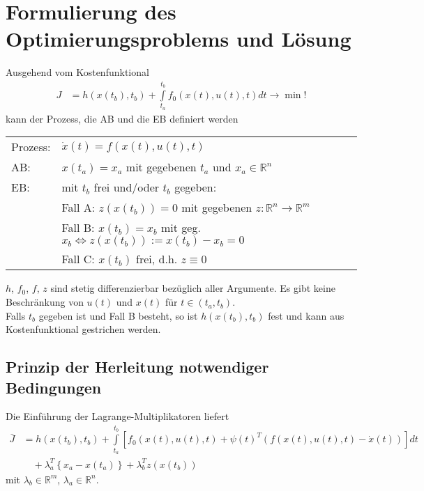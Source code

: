 \section{Formulierung des Optimierungsproblems und Lösung}
Ausgehend vom Kostenfunktional
\begin{align*}
	J & = h\left(x(t_b),t_b \right) + \int\limits_{t_a}^{t_b}f_0\left(x(t),u(t),t \right)dt\rightarrow \min!
\end{align*}
kann der Prozess, die \ac{AB} und die \ac{EB} definiert werden\\
\begin{tabular}{ll}
Prozess: & $\dot{x}(t)=f\left(x(t),u(t),t \right)$\\
\ac{AB}: & $x(t_a)=x_a$ mit gegebenen $t_a$ und $x_a\in\mathbb{R}^n$\\
\ac{EB}: & mit $t_b$ frei und/oder $t_b$ gegeben:\\
		 & Fall A: $z\left(x(t_b) \right)=0$ mit gegebenen $z:\mathbb{R}^n\rightarrow\mathbb{R}^m$\\
		 & Fall B: $x(t_b)=x_b$ mit geg. $x_b\Leftrightarrow z(x(t_b)):=x(t_b)-x_b=0$\\
		 & Fall C: $x(t_b)$ frei, d.h. $z\equiv 0$ 
\end{tabular}
$h$, $f_0$, $f$, $z$ sind stetig differenzierbar bezüglich aller Argumente. Es gibt keine Beschränkung von $u(t)$ und $x(t)$ für $t\in\left(t_a, t_b
\right)$.\\
Falls $t_b$ gegeben ist und Fall B besteht, so ist $h(x(t_b),t_b)$ fest und kann aus Kostenfunktional gestrichen werden.

\subsection{Prinzip der Herleitung notwendiger Bedingungen}
\label{sec:kap_2_pr_herl_not_bed}
Die Einführung der Lagrange-Multiplikatoren liefert
\begin{align*}
	\bar{J} & = h\left(x(t_b),t_b \right)+\int\limits_{t_a}^{t_b}\left[f_0\left(x(t),u(t),t \right)+\psi(t)^T\left(f(x(t),u(t),t)-\dot{x}(t) \right)
	\right]dt\\
	& \quad + \lambda_a^T\left\{x_a - x(t_a) \right\} + \lambda_b^T z\left(x(t_b) \right)
\end{align*}
mit $\lambda_b\in\mathbb{R}^m$, $\lambda_a\in\mathbb{R}^n$.

